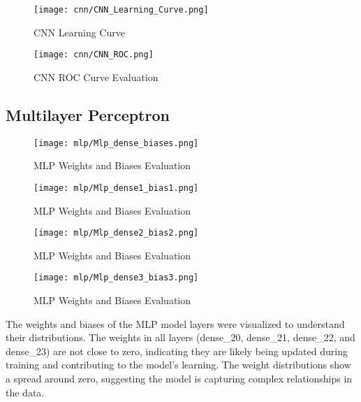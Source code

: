 \begin{figure}[H] 
  \centering
  \texttt{[image: cnn/CNN\_Learning\_Curve.png]}
  \caption{CNN Learning Curve}\label{fig:cnn_learning_curve}
\end{figure}

\begin{figure}[H] 
  \centering
  \texttt{[image: cnn/CNN\_ROC.png]}
  \caption{CNN ROC Curve Evaluation}\label{fig:cnn_roc_curve}
\end{figure}


\subsection{Multilayer Perceptron}\label{mlp_visual}

\begin{figure}[H] 
  \centering
  \texttt{[image: mlp/Mlp\_dense\_biases.png]}
  \caption{MLP Weights and Biases Evaluation}\label{fig:mlp_weights_biases}
\end{figure}

\begin{figure}[H] 
  \centering
  \texttt{[image: mlp/Mlp\_dense1\_bias1.png]}
  \caption{MLP Weights and Biases Evaluation}\label{fig:dense1_bias1}
\end{figure}

\begin{figure}[H] 
  \centering
  \texttt{[image: mlp/Mlp\_dense2\_bias2.png]}
  \caption{MLP Weights and Biases Evaluation}\label{fig:dense2_bias2}
\end{figure}

\begin{figure}[H] 
  \centering
  \texttt{[image: mlp/Mlp\_dense3\_bias3.png]}
  \caption{MLP Weights and Biases Evaluation}\label{fig:dense3_bias3}
\end{figure}

The weights and biases of the MLP model layers were visualized to understand their distributions. The weights in all layers (dense_20, dense_21, dense_22, and dense_23) are not close to zero, indicating they are likely being updated during training and contributing to the model’s learning. The weight distributions show a spread around zero, suggesting the model is capturing complex relationships in the data.


